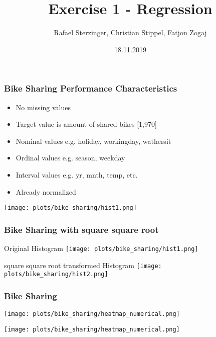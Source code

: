 \documentclass[aspectratio=169]{beamer}
\title[Your Short Title]{Exercise 1 - Regression}
\author{Rafael Sterzinger, Christian Stippel, Fatjon Zogaj}
\institute{Machine Learning}
\date{18.11.2019}
\begin{document}

\begin{frame}
  \titlepage
\end{frame}

\begin{frame}{}
\frametitle{Bike Sharing Performance Characteristics}
\begin{minipage}{0.45\textwidth}
\begin{itemize}
\item No missing values
\item Target value is amount of shared bikes [1,970]
\item Nominal values e.g. holiday, workingday, wathersit
\item Ordinal values e.g. season, weekday
\item Interval values e.g. yr, mnth, temp, etc.
\item Already normalized
\end{itemize}
\end{minipage}
\begin{minipage}{0.5\textwidth}
    \texttt{[image: plots/bike\_sharing/hist1.png]}
\end{minipage}
\end{frame}

\begin{frame}
\frametitle{Bike Sharing with square square root}
\begin{minipage}{0.49\textwidth}
	\center Original Histogram
    \texttt{[image: plots/bike\_sharing/hist1.png]}
\end{minipage}
\begin{minipage}{0.49\textwidth}
	\center square square root transformed Histogram
    \texttt{[image: plots/bike\_sharing/hist2.png]}
\end{minipage}
\end{frame}

\begin{frame}
\frametitle{Bike Sharing }
\begin{minipage}{1\textwidth}
	\center 
	\texttt{[image: plots/bike\_sharing/heatmap\_numerical.png]}
\end{minipage}
\begin{minipage}{1\textwidth}
	\center 
	\texttt{[image: plots/bike\_sharing/heatmap\_numerical.png]}
\end{minipage}
\end{frame}
\end{document}
